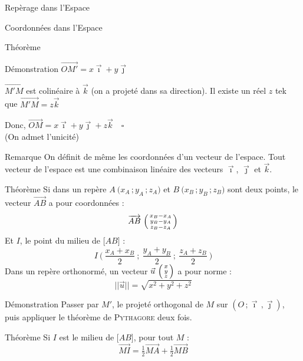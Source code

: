 \documentclass{coursbook}
\begin{document}
\begin{Gpartie}{Repèrage dans l'Espace}
\begin{Spartie}{Coordonnées dans l'Espace}
\begin{SSpartie}{Théorème}
\begin{SSSpartie}{Démonstration}
                    $\overrightarrow{OM'}=x\vec{\imath}+y\vec{\jmath}$

                    $\overrightarrow{M'M}$ est colinéaire à $\vec{k}$ (on a projeté dans sa direction). Il existe un réel $z$ tek que $\overrightarrow{M'M}=z\vec{k}$

                    Donc, $\overrightarrow{OM}=x\vec{\imath}+y\vec{\jmath}+z\vec{k}\quad\square$ \\
                    (On admet l'unicité)
                \end{SSSpartie}
                \begin{SSSpartie}{Remarque} 
                    On définit de même les coordonnées d'un vecteur de l'espace. Tout vecteur de l'espace est une combinaison linéaire des vecteurs $\vec{\imath}$, $\vec{\jmath}$ et $\vec{k}$.
                \end{SSSpartie}
            \end{SSpartie}
            \begin{SSpartie}{Théorème} 
                Si dans un repère $A~\big(x_A\,; y_A\,; z_A\big)$ et $B~\big(x_B\,; y_B\,; z_B\big)$ sont deux points, le vecteur $\overrightarrow{AB}$ a pour coordonnées : 
                \[\overrightarrow{AB}~\begin{psmallmatrix} x_B-x_A \\ y_B-y_A \\ z_B-z_A \end{psmallmatrix}\]
                Et $I$, le point du milieu de $\big[AB\big]$ :
                \[I~\Bigg(~\frac{x_A+x_B}{2}~;~\frac{y_A+y_B}{2}~;~\frac{z_A+z_B}{2}~\Bigg)\]
                Dans un repère orthonormé, un vecteur $\vec{u}~\begin{psmallmatrix}x \\ y \\ z\end{psmallmatrix}$ a pour norme :
                \[\lvert\lvert\vec{u}\rvert\rvert=\sqrt{x^2+y^2+z^2}\]
                \begin{SSSpartie}{Démonstration} 
                    Passer par $M'$, le projeté orthogonal de $M$ sur $\left(O\,;\vec{\imath}\,,\vec{\jmath}\right)$, puis appliquer le théorème de \textsc{Pythagore} deux fois.
                \end{SSSpartie}
            \end{SSpartie}
            \begin{SSpartie}{Théorème} 
                Si $I$ est le milieu de $\big[AB\big]$, pour tout $M$ :
                \[\overrightarrow{MI}=\tfrac{1}{2}\overrightarrow{MA}+\tfrac{1}{2}\overrightarrow{MB}\]

\end{SSpartie}
\end{Spartie}
\end{Gpartie}
\end{document}
